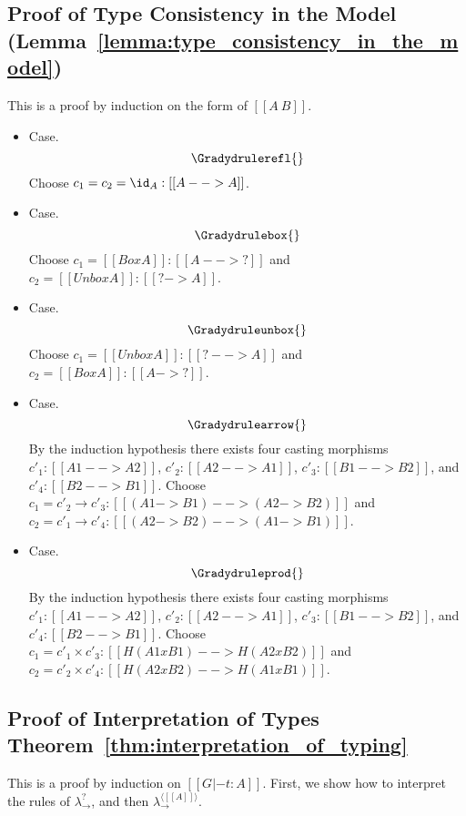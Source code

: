 \subsection{Proof of Type Consistency in the Model (Lemma~\ref{lemma:type_consistency_in_the_model})}
\label{subsec:proof_of_type_consistency_in_the_model}
This is a proof by induction on the form of $[[A ~ B]]$.
\begin{itemize}
\item[] Case.
  \[
  \Gradydrulerefl{}
  \]
  Choose $c_1 = c_2 = \id_A : [[A --> A]]$.

\item[] Case.
  \[
  \Gradydrulebox{}
  \]
  Choose $c_1 = [[Box A]] : [[A --> ?]]$ and $c_2 = [[Unbox A]] : [[? -> A]]$.

\item[] Case.
  \[
  \Gradydruleunbox{}
  \]
  Choose $c_1 = [[Unbox A]] : [[? --> A]]$ and $c_2 = [[Box A]] : [[A -> ?]]$.
  
\item[] Case.
  \[
  \Gradydrulearrow{}
  \]
  By the induction hypothesis there exists four casting morphisms
  $c'_1 : [[A1 --> A2]]$, $c'_2 : [[A2 --> A1]]$, $c'_3 : [[B1 --> B2]]$,
  and $c'_4 : [[B2 --> B1]]$.  Choose
  $c_1 = c'_2 \to c'_3 : [[(A1 -> B1) --> (A2 -> B2)]]$
  and
  $c_2 = c'_1 \to c'_4 : [[(A2 -> B2) --> (A1 -> B1)]]$.

\item[] Case.
  \[
  \Gradydruleprod{}
  \]
  By the induction hypothesis there exists four casting morphisms
  $c'_1 : [[A1 --> A2]]$, $c'_2 : [[A2 --> A1]]$, $c'_3 : [[B1 --> B2]]$,
  and $c'_4 : [[B2 --> B1]]$.
  Choose
  $c_1 = c'_1 \times c'_3 : [[H(A1 x B1) --> H(A2 x B2)]]$
  and
  $c_2 = c'_2 \times c'_4 : [[H(A2 x B2) --> H(A1 x B1)]]$.
\end{itemize}

\subsection{Proof of Interpretation of Types Theorem~\ref{thm:interpretation_of_typing}}
\label{subsec:proof_of_interpretation_of_types}
This is a proof by induction on $[[G |- t : A]]$.  First, we show
how to interpret the rules of $\lambda^?_\to$, and then
$\lambda^{\langle [[A]] \rangle}_\to$.

